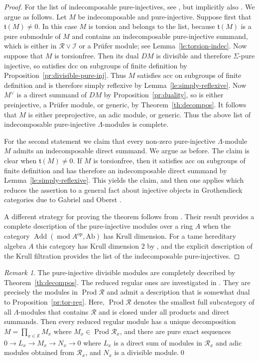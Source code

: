 \documentclass[a4paper]{amsart}
\theoremstyle{plain}
\theoremstyle{definition}
\theoremstyle{remark}
\newtheorem{rem}[thm]{Remark}
\numberwithin{equation}{section}
\newcommand{\Add}{\operatorname{Add}}
\renewcommand{\mod}{\operatorname{mod}}
\newcommand{\Prod}{\operatorname{Prod}}
\newcommand{\Ab}{\mathrm{Ab}}
\newcommand{\op}{\mathrm{op}}
\def\I{\mathcal I}
\def\R{\mathcal R}
\newcommand{\frt}{\mathfrak t}
\def\La{\Lambda}
\def\Si{\Sigma}
\begin{document}
\begin{proof}
  For the list of indecomposable pure-injectives, see
  \cite{DR1976,Ok1980,Pr1988}, but implicitly also \cite{Ge1985}. We
  argue as follows. Let $M$ be indecomposable and
  pure-injective. Suppose first that $\frt(M)\neq 0$. In this case $M$
  is torsion and belongs to the list, because $\frt(M)$ is a pure submodule of $M$ and
  contains an indecomposable pure-injective summand, which is either
  in $\R\vee\I$ or a Pr\"ufer module; see
  Lemma~\ref{le:torsion-indec}. Now suppose that $M$ is
  torsionfree. Then its dual $DM$ is divisible and therefore
  $\Si$-pure injective, so satisfies dcc on subgroups of finite
  definition by Proposition~\ref{pr:divisible-pure-inj}. Thus $M$
  satisfies acc on subgroups of finite definition and is therefore
  simply reflexive by Lemma~\ref{le:simply-reflexive}. Now $M^\vee$ is
  a direct summand
  of $DM$ by 
  Proposition~\ref{pr:duality}, so is either preinjective, a Pr\"ufer module, or
  generic, by Theorem~\ref{th:decompos}. It follows that $M$ is either
  preprojective, an adic module, or generic. Thus the above list of
  indecomposable pure-injective $\La$-modules is complete.

  For the second statement we claim that every non-zero pure-injective
  $\La$-module $M$ admits an indecomposable direct summand. We argue
  as before. The claim is clear when $\frt(M)\neq 0$. If $M$ is
  torsionfree, then it satisfies acc on subgroups of finite definition
  and has therefore an indecomposable direct summand by
  Lemma~\ref{le:simply-reflexive}.  This yields the claim, and then
  one applies \cite[Theorem~8.28]{JL1989} which reduces the assertion
  to a general fact about injective objects in Grothendieck categories
  due to Gabriel and Oberst \cite{GO1966}.
 
  A different strategy for proving the theorem follows from
  \cite[Theorem~8.53]{JL1989}. Their result provides a complete
  description of the pure-injective modules over a ring $A$ when the
  category $\Add(\mod A^\op,\Ab)$ has Krull dimension. For  a
  tame hereditary algebra $A$ this category has Krull dimension $2$ by
  \cite{Ge1985}, and the explicit description of the Krull filtration
  provides the list of the indecomposable pure-injectives.
\end{proof}

\begin{rem}
  The pure-injective divisible modules are completely described by
  Theorem~\ref{th:decompos}. The reduced regular ones are investigated
  in {\cite[2.2, 2.3, 2.4]{R1}}. They are precisely the modules in
  $\Prod\R$ and admit a description that is somewhat dual to
  Proposition~\ref{pr:tor-reg}. Here, $\Prod\R$  denotes the smallest full
subcategory of all $\La$-modules that contains $\R$ and is closed under all products and
direct summands. Then  every reduced regular module has a
  unique decomposition $M=\prod_{x\in\mathbb X}M_x$ where
  $M_x\in\Prod{\R_x}$, and there are pure exact sequences
  $0\to L_x\to M_x\to N_x\to 0$ where $L_x$ is a direct sum of modules
  in ${\R_x}$ and adic modules obtained from ${\R_x}$, and $N_x$ is a
  divisible module.\qed
\end{rem}
\end{document}
